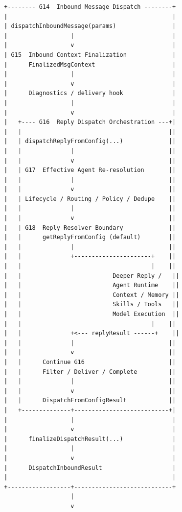 \begin{landscape}
\begin{figure}[p]
\begin{verbatim}
        +-------- G14  Inbound Message Dispatch --------+
        |                                               |
        | dispatchInboundMessage(params)                |
        |                  |                            |
        |                  v                            |
        | G15  Inbound Context Finalization             |
        |      FinalizedMsgContext                      |
        |                  |                            |
        |                  v                            |
        |      Diagnostics / delivery hook              |
        |                  |                            |
        |                  v                            |
        |   +---- G16  Reply Dispatch Orchestration ---+|
        |   |                                          ||
        |   | dispatchReplyFromConfig(...)             ||
        |   |              |                           ||
        |   |              v                           ||
        |   | G17  Effective Agent Re-resolution       ||
        |   |              |                           ||
        |   |              v                           ||
        |   | Lifecycle / Routing / Policy / Dedupe    ||
        |   |              |                           ||
        |   |              v                           ||
        |   | G18  Reply Resolver Boundary             ||
        |   |      getReplyFromConfig (default)        ||
        |   |              |                           ||
        |   |              +----------------------+    ||
        |   |                                     |    ||
        |   |                          Deeper Reply /   ||
        |   |                          Agent Runtime    ||
        |   |                          Context / Memory ||
        |   |                          Skills / Tools   ||
        |   |                          Model Execution  ||
        |   |                                     |    ||
        |   |              +<--- replyResult ------+    ||
        |   |              |                           ||
        |   |              v                           ||
        |   |      Continue G16                        ||
        |   |      Filter / Deliver / Complete         ||
        |   |              |                           ||
        |   |              v                           ||
        |   |      DispatchFromConfigResult            ||
        |   +--------------+---------------------------+|
        |                  |                            |
        |                  v                            |
        |      finalizeDispatchResult(...)              |
        |                  |                            |
        |                  v                            |
        |      DispatchInboundResult                    |
        |                                               |
        +------------------+----------------------------+
                           |
                           v


\end{verbatim}
\end{figure}
\end{landscape}

